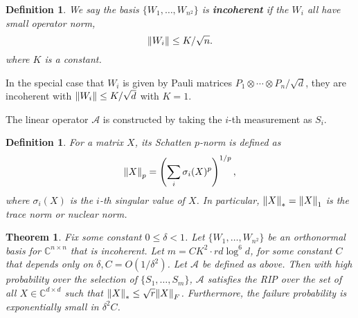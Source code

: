 \documentclass[10pt]{article}  %
\theoremstyle{plain}
\newtheorem{theorem}{Theorem}[section]
\newtheorem{definition}[thm]{Definition}
\numberwithin{equation}{section}
\def\mA{\mathcal{A}}
\def\C{\mathbb{C}}
\renewcommand{\C}{\mathbb{C}}
\begin{document}
\begin{definition}
	We say the basis $\{W_1, \dots, W_{n^2}\}$ is \textbf{incoherent} if the $W_i$ all have small operator norm, \\
	\begin{equation}
		\norm{W_i} \leq K/\sqrt{n}.
	\end{equation}
	where $K$ is a constant. 
\end{definition}

In the special case that $W_i$ is given by Pauli matrices $P_1 \otimes \cdots \otimes P_n/\sqrt{d}$, they are incoherent with $\norm{W_i} \leq K/\sqrt d$ with $K = 1$. 

The linear operator $\mA$ is constructed by taking the $i$-th measurement as $S_i$. 
\begin{definition}
	For a matrix $X$, its Schatten $p$-norm is defined as 
	\begin{equation}
		\norm{X}_p = \left(\sum_{i}\sigma_i(X)^p\right)^{1/p},
	\end{equation}
	where $\sigma_i(X)$ is the $i$-th singular value of $X$. In particular, $\norm{X}_* = \norm{X}_1$ is the trace norm or nuclear norm. 
\end{definition}

\begin{theorem}\cite[Theorem 2.1]{liuUniversalLowrankMatrix2011}
	Fix some constant $0 \leq \delta <1$. Let $\{W_1, \dots, W_{n^2}\}$ be an orthonormal basis for $\C^{n \times n}$ that is incoherent. Let $m = CK^2\cdot rd \log^6 d$, for some constant $C$ that depends only on $\delta, C = O(1/\delta^2)$. Let $\mA$ be defined as above. Then with high probability over the selection of $\{S_1, \dots, S_m\}$, $\mA$ satisfies the RIP over the set of all $X\in \C^{d \times d}$ such that $\norm{X}_* \leq \sqrt{r} \norm{X}_F$. Furthermore, the failure probability is exponentially small in $\delta^2C$. 
\end{theorem}



\printbibliography
\end{document}
